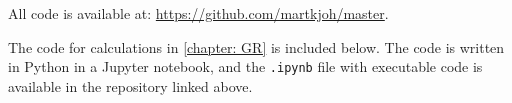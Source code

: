 \label{appendix: code} 
 
All code is available at: \url{https://github.com/martkjoh/master}.

The code for calculations in \autoref{chapter: GR} is included below.
The code is written in Python in a Jupyter notebook, and the \texttt{.ipynb} file with executable code is available in the repository linked above.



